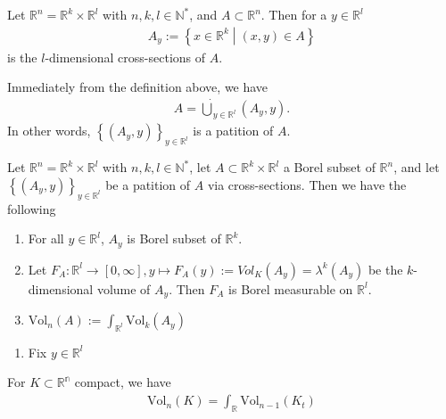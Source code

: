 \begin{definition}
    Let \(\mathbb{R}^n = \mathbb{R}^k \times \mathbb{R}^l\) with \(n, k, l \in \mathbb{N}^*\), and \(A \subset \mathbb{R}^n\). Then for a \(y \in \mathbb{R}^l\)
    \begin{align}
        A_y := \left\{ x \in \mathbb{R}^k \middle| (x, y) \in A \right\}
    \end{align}
    is the \(l\)-dimensional cross-sections of \(A\).
\end{definition}
\begin{remark}
    Immediately from the definition above, we have
    \begin{align}
        A = \dot\bigcup_{y \in \mathbb{R}^l}(A_y, y) \text{.}
    \end{align}
    In other words, \( \left\{(A_y, y)\right\}_{y \in \mathbb{R}^l}\) is a patition of \(A\).
\end{remark}
\begin{theorem}
    Let \(\mathbb{R}^n = \mathbb{R}^k \times \mathbb{R}^l\) with \(n, k, l \in \mathbb{N}^*\), let \(A \subset \mathbb{R}^k \times \mathbb{R}^l\) a Borel subset of \(\mathbb{R}^n\), and let \( \left\{(A_y, y)\right\}_{y \in \mathbb{R}^l}\) be a patition of \(A\) via cross-sections. Then we have the following
    \begin{enumerate}
        \item For all \(y \in \mathbb{R}^l\), \(A_y\) is Borel subset of \(\mathbb{R}^k\).
        \item Let \(F_A: \mathbb{R}^l \rightarrow [0, \infty], y \mapsto F_A(y) := Vol_K(A_y) = \lambda^k (A_y)\) be the \(k\)-dimensional volume of \(A_y\). Then \(F_A\) is Borel measurable on \(\mathbb{R}^l\).
        \item \(\text{Vol}_n(A) := \int_{\mathbb{R}^l} \text{Vol}_k (A_y)\)
    \end{enumerate}
\end{theorem}
\proof
\begin{enumerate}
    \item Fix \(y \in \mathbb{R}^l\)
\end{enumerate}
\begin{theorem}
    For \(K \subset \mathbb{R^n}\) compact, we have
    \begin{align}
        \text{Vol}_n (K) = \int_{\mathbb{R}} \text{Vol}_{n-1}(K_t)
    \end{align}
\end{theorem}